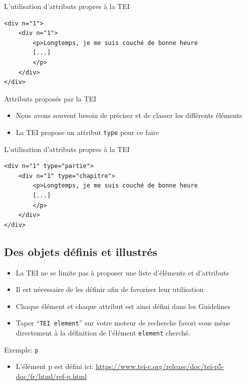 \documentclass[11pt,aspectratio=1610]{beamer}
\begin{document}
\begin{frame}[containsverbatim]{L'utilisation d'attributs propres à la TEI}
\begin{verbatim}
<div n="1">
    <div n="1">
        <p>Longtemps, je me suis couché de bonne heure 
        [...]
        </p>
    </div>
</div>
\end{verbatim}
\end{frame}

\begin{frame}{Attributs proposés par la TEI}
\begin{itemize}
\item Nous avons souvent besoin de préciser et de classer les différents éléments
\item La TEI propose un attribut \texttt{type} pour ce faire
\end{itemize}
\end{frame}

\begin{frame}[containsverbatim]{L'utilisation d'attributs propres à la TEI}
\begin{verbatim}
<div n="1" type="partie">
    <div n="1" type="chapitre">
        <p>Longtemps, je me suis couché de bonne heure 
        [...]
        </p>
    </div>
</div>
\end{verbatim}
\end{frame}

\subsection{Des objets définis et illustrés}
\begin{frame}
\begin{itemize}
\item La TEI ne se limite pas à proposer une liste d'éléments et d'attributs
\item Il est nécessaire de les définir afin de favoriser leur utilisation
\item Chaque élément et chaque attribut est ainsi défini dans les Guidelines
\item Taper \enquote{\texttt{TEI element}} sur votre moteur de recherche favori vous mène directement à la définition de l'élément \texttt{element} cherché.
\end{itemize}
\end{frame}


\begin{frame}{Exemple: \texttt{p}}
\begin{itemize}
\item L'élément p est défini ici: \href{https://www.tei-c.org/release/doc/tei-p5-doc/fr/html/ref-p.html}{https://www.tei-c.org/release/doc/tei-p5-doc/fr/html/ref-p.html}
\end{itemize}
\end{frame}
\end{document}
